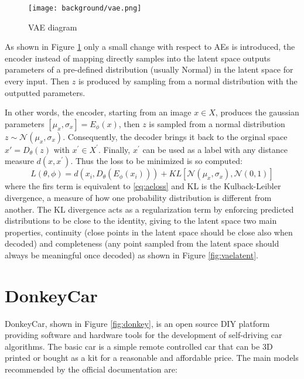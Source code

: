 \begin{figure}[h]
  \begin{center}
    \texttt{[image: background/vae.png]}
  \end{center}
  \caption{VAE diagram}
  \label{fig:vae}
\end{figure}

As shown in Figure \ref{fig:vae} only a small change with respect to AEs is introduced, the encoder instead of mapping directly samples into the latent space outputs parameters of a pre-defined distribution (usually Normal) in the latent space for every input. Then $z$ is produced by sampling from a normal distribution with the outputted parameters. 

In other words, the encoder, starting from an image $x\in X$, produces the gaussian parameters ${[\mu_x, \sigma_x]=E_{\phi }(x)}$, then $z$ is sampled from a normal distribution $z \sim \mathcal{N}(\mu_x, \sigma_x)$. Consequently, the decoder brings it back to the orginal space ${x'=D_{\theta }(z)}$ with $x^{'}\in X^{'}$. Finally, $x^{'}$ can be used as a label with any distance measure $d(x,x^{'})$. Thus the loss to be minimized is so computed:
\begin{equation}
\label{eq:vaeloss}
  L(\theta ,\phi) = d(x_{i},D_{\theta }(E_{\phi }(x_{i}))) + KL[\mathcal{N} (\mu_x, \sigma_x),\mathcal{N}(0, 1)]
\end{equation}
where the firs term is equivalent to \ref{eq:aeloss} and KL is the Kulback-Leibler divergence, a measure of how one probability distribution is different from another. The KL divergence acts as a regularization term by enforcing predicted distributions to be close to the identity, giving to the latent space two main properties, continuity (close points in the latent space should be close also when decoded) and completeness (any point sampled from the latent space should always be meaningful once decoded) as shown in Figure \ref{fig:vaelatent}.

\section{DonkeyCar} \label{sec:donkeycar}
DonkeyCar, shown in Figure \ref{fig:donkey}, is an open source DIY platform providing software and hardware tools for the development of self-driving car algorithms. The basic car is a simple remote controlled car that can be 3D printed or bought as a kit for a reasonable and affordable price. The main models recommended by the official documentation are:

